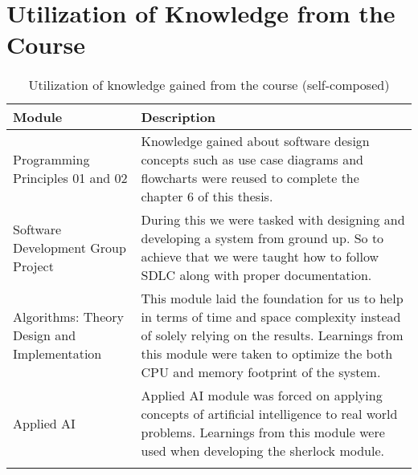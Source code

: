 \section{Utilization of Knowledge from the Course}


\begin{longtable}{|p{50mm}|p{105mm}|}
    \hline
    \textbf{Module} & 
    \textbf{Description} 
    \\ \hline

    Programming Principles 01 and 02 & 
    Knowledge gained about software design concepts such as use case diagrams and flowcharts were reused to complete the chapter 6 of this thesis. 
    \\ \hline

    Software Development Group Project & 
    During this we were tasked with designing and developing a system from ground up. So to achieve that we were taught how to follow SDLC along with proper documentation. 
    \\ \hline

    Algorithms: Theory Design and Implementation & 
    This module laid the foundation for us to help in terms of time and space complexity instead of solely relying on the results. Learnings from this module were taken to optimize the both CPU and memory footprint of the system. 
    \\ \hline

    Applied AI & 
    Applied AI module was forced on applying concepts of artificial intelligence to real world problems. Learnings from this module were used when developing the \ac{sherlock} module. 
    \\ \hline    

    \caption{Utilization of knowledge gained from the course (self-composed)}
  \end{longtable}
  